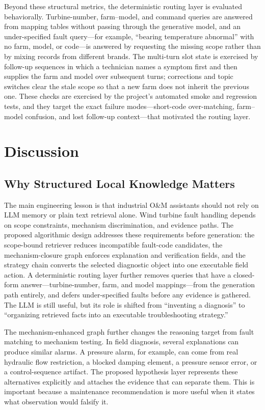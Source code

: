 \documentclass[lettersize,journal]{IEEEtran}
\begin{document}
Beyond these structural metrics, the deterministic routing layer is evaluated behaviorally. Turbine-number, farm--model, and command queries are answered from mapping tables without passing through the generative model, and an under-specified fault query---for example, ``bearing temperature abnormal'' with no farm, model, or code---is answered by requesting the missing scope rather than by mixing records from different brands. The multi-turn slot state is exercised by follow-up sequences in which a technician names a symptom first and then supplies the farm and model over subsequent turns; corrections and topic switches clear the stale scope so that a new farm does not inherit the previous one. These checks are exercised by the project's automated smoke and regression tests, and they target the exact failure modes---short-code over-matching, farm--model confusion, and lost follow-up context---that motivated the routing layer.

\section{Discussion}
\subsection{Why Structured Local Knowledge Matters}
The main engineering lesson is that industrial O\&M assistants should not rely on LLM memory or plain text retrieval alone. Wind turbine fault handling depends on scope constraints, mechanism discrimination, and evidence paths. The proposed algorithmic design addresses these requirements before generation: the scope-bound retriever reduces incompatible fault-code candidates, the mechanism-closure graph enforces explanation and verification fields, and the strategy chain converts the selected diagnostic object into one executable field action. A deterministic routing layer further removes queries that have a closed-form answer---turbine-number, farm, and model mappings---from the generation path entirely, and defers under-specified faults before any evidence is gathered. The LLM is still useful, but its role is shifted from ``inventing a diagnosis'' to ``organizing retrieved facts into an executable troubleshooting strategy.''

The mechanism-enhanced graph further changes the reasoning target from fault matching to mechanism testing. In field diagnosis, several explanations can produce similar alarms. A pressure alarm, for example, can come from real hydraulic flow restriction, a blocked damping element, a pressure sensor error, or a control-sequence artifact. The proposed hypothesis layer represents these alternatives explicitly and attaches the evidence that can separate them. This is important because a maintenance recommendation is more useful when it states what observation would falsify it.
\end{document}
